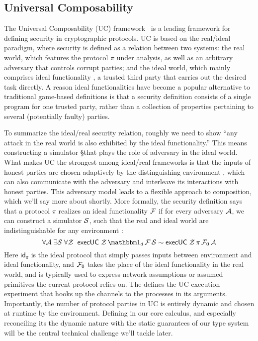 \subsection{Universal Composability}
The Universal Composability (UC) framework~\cite{uc} is a leading framework for defining security in cryptographic protocols.
UC is based on the real/ideal paradigm, where security is defined as a relation between two systems: the real world, which features the protocol $\pi$ under analysis, as well as an arbitrary adversary \A that controls corrupt parties; and the ideal world, which mainly comprises ideal functionality \F, a trusted third party that carries out the desired task directly.
A reason ideal functionalities have become a popular alternative to traditional game-based definitions is that a security definition consists of a single program for one trusted party, rather than a collection of properties pertaining to several (potentially faulty) parties.

To summarize the ideal/real security relation, roughly we need to show ``any attack in the real world is also exhibited by the ideal functionality.'' This means constructing a simulator \S that plays the role of adversary in the ideal world.
What makes UC the strongest among ideal/real frameworks is that the inputs of honest parties are chosen adaptively by the distinguishing environment \Z, which can also communicate with the adversary and interleave its interactions with honest parties.
This adversary model leads to a flexible approach to composition, which we'll say more about shortly.
More formally, the security definition says that a protocol $\pi$ realizes an ideal functionality $\mathcal{F}$
 if for every adversary $\mathcal{A}$, we can construct a simulator $\mathcal{S}$, such that the real and ideal world are indistinguishable for any environment \Z:
 \[ \forall \A \; \exists \Sim \; \forall \Z \; \; \msf{execUC} \; \Z \, \idealP \, \F \, \Sim \sim \msf{execUC} \; \Z \, \pi \, \F_0 \, \A \]
Here $\textsf{id}_\pi$ is the ideal protocol that simply passes inputs between environment and ideal functionality, and $\mathcal{F}_0$ takes the place of the ideal functionality in the real world, and is typically used to express network assumptions or assumed primitives the current protocol relies on.
The  defines the UC execution experiment that hooks up the channels to the processes in its arguments.
Importantly, the number of protocol parties in UC is entirely dynamic and chosen at runtime by the environment. 
Defining  in our core calculus, and especially reconciling its the dynamic nature with the static guarantees of our type system will be the central technical challenge we'll tackle later.

